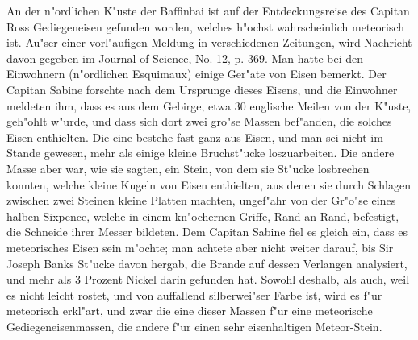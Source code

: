 \documentclass[a4paper, 11pt, oneside, polutonikogreek, german]{article}
\begin{document}
An der n"ordlichen K"uste der Baffinbai ist auf der Entdeckungsreise des Capitan Ross Gediegeneisen gefunden worden, welches h"ochst wahrscheinlich meteorisch ist. Au"ser einer vorl"aufigen Meldung in verschiedenen Zeitungen, wird Nachricht davon gegeben im Journal of Science, No. 12, p. 369. Man hatte bei den Einwohnern (n"ordlichen Esquimaux) einige Ger"ate von Eisen bemerkt. Der Capitan Sabine forschte nach dem Ursprunge dieses Eisens, und die Einwohner meldeten ihm, dass es aus dem Gebirge, etwa 30 englische Meilen von der K"uste, geh"ohlt w"urde, und dass sich dort zwei gro"se Massen bef"anden, die solches Eisen enthielten. Die eine bestehe fast ganz aus Eisen, und man sei nicht im Stande gewesen, mehr als einige kleine Bruchst"ucke loszuarbeiten. Die andere Masse aber war, wie sie sagten, ein Stein, von dem sie St"ucke losbrechen konnten, welche kleine Kugeln von Eisen enthielten, aus denen sie durch Schlagen zwischen zwei Steinen kleine Platten machten, ungef"ahr von der Gr"o"se eines halben Sixpence, welche in einem kn"ochernen Griffe, Rand an Rand, befestigt, die Schneide ihrer Messer bildeten. Dem Capitan Sabine fiel es gleich ein, dass es meteorisches Eisen sein m"ochte; man achtete aber nicht weiter darauf, bis Sir Joseph Banks St"ucke davon hergab, die Brande auf dessen Verlangen analysiert, und mehr als 3 Prozent Nickel darin gefunden hat. Sowohl deshalb, als auch, weil es nicht leicht rostet, und von auffallend silberwei"ser Farbe ist, wird es f"ur meteorisch erkl"art, und zwar die eine dieser Massen f"ur eine meteorische Gediegeneisenmassen, die andere f"ur einen sehr eisenhaltigen Meteor-Stein.
\subsection{}
\end{document}
